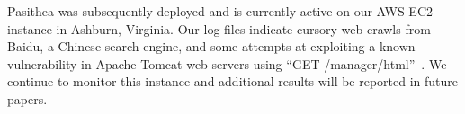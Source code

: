 Pasithea was subsequently deployed and is currently active on our AWS EC2 instance in Ashburn, Virginia. 
Our log files indicate cursory web crawls from Baidu, a Chinese search engine, and some attempts at exploiting a known vulnerability in Apache Tomcat web servers using ``GET /manager/html''~\cite{Tomcat-Exploit}. 
We continue to monitor this instance and additional results will be reported in future papers.

